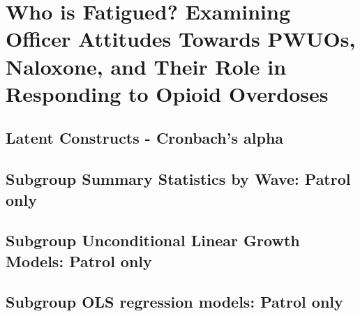 \chapter{Who is Fatigued? Examining Officer Attitudes Towards PWUOs, Naloxone, and Their Role in Responding to Opioid Overdoses}
\section{Latent Constructs - Cronbach's alpha} %

\newpage

\section{Subgroup Summary Statistics by Wave: Patrol only}
\begin{landscape}

\end{landscape}

\newpage

\section{Subgroup Unconditional Linear Growth Models: Patrol only} %

\newpage

\section{Subgroup OLS regression models: Patrol only}
\begin{landscape}

\end{landscape}